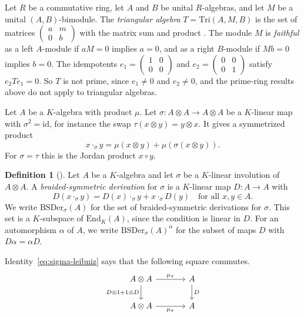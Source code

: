 \documentclass[]{interact}
\theoremstyle{plain}
\theoremstyle{definition}
\newtheorem{definition}[theorem]{Definition}
\theoremstyle{remark}
\newcommand{\BSDer}{\mathrm{BSDer}}
\begin{document}
Let $R$ be a commutative ring, let $A$ and $B$ be unital $R$-algebras, and let $M$ be a unital $(A,B)$-bimodule.
The \emph{triangular algebra} $T = \mathrm{Tri}(A,M,B)$ is the set of matrices $\left(\begin{smallmatrix} a & m \\ 0 & b \end{smallmatrix}\right)$ with the matrix sum and product \citep[\S2]{Cheung2003}.
The module $M$ is \emph{faithful} as a left $A$-module if $aM = 0$ implies $a = 0$, and as a right $B$-module if $Mb = 0$ implies $b = 0$.
The idempotents $e_1 = \left(\begin{smallmatrix} 1 & 0 \\ 0 & 0 \end{smallmatrix}\right)$ and $e_2 = \left(\begin{smallmatrix} 0 & 0 \\ 0 & 1 \end{smallmatrix}\right)$ satisfy $e_2 T e_1 = 0$.
So $T$ is not prime, since $e_1 \neq 0$ and $e_2 \neq 0$, and the prime-ring results above do not apply to triangular algebras.



Let $A$ be a $K$-algebra with product $\mu$.
Let $\sigma \colon A \otimes A \to A \otimes A$ be a $K$-linear map with $\sigma^2 = \mathrm{id}$, for instance the swap $\tau(x \otimes y) = y \otimes x$.
It gives a symmetrized product \cite[Section 2]{Adrabi2026a}
\[
x \cdot_\sigma y = \mu(x \otimes y) + \mu(\sigma(x \otimes y)).
\]
For $\sigma = \tau$ this is the Jordan product $x \circ y$.

\begin{definition}[{\cite[Definition 2.1]{Adrabi2026a}}]\label{def:sigma-derivation}
Let $A$ be a $K$-algebra and let $\sigma$ be a $K$-linear involution of $A \otimes A$.
A \emph{braided-symmetric derivation} for $\sigma$ is a $K$-linear map $D \colon A \to A$ with
\begin{equation}\label{eq:sigma-leibniz}
D(x \cdot_\sigma y) = D(x) \cdot_\sigma y + x \cdot_\sigma D(y) \quad \text{for all } x, y \in A.
\end{equation}
We write $\BSDer_\sigma(A)$ for the set of braided-symmetric derivations for $\sigma$.
This set is a $K$-subspace of $\mathrm{End}_K(A)$, since the condition is linear in $D$.
For an automorphism $\alpha$ of $A$, we write $\BSDer_\sigma(A)^\alpha$ for the subset of maps $D$ with $D\alpha = \alpha D$.
\end{definition}

Identity~\eqref{eq:sigma-leibniz} says that the following square commutes.
\[
\begin{tikzcd}[column sep=large]
A \otimes A \arrow[r, "\mu_\sigma"] \arrow[d, "D \otimes 1 + 1 \otimes D"'] & A \arrow[d, "D"] \\
A \otimes A \arrow[r, "\mu_\sigma"'] & A
\end{tikzcd}
\]
\end{document}

